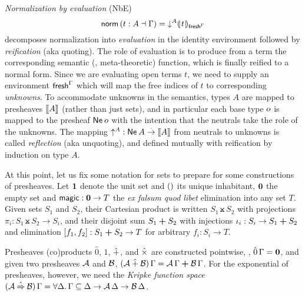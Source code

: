 \documentclass[sigplan,screen]{acmart}
\begin{document}
%
\emph{Normalization by evaluation} (NbE)
\[
  \mathsf{norm}\, (t : A \dashv \Gamma)
  = \mathord{\downarrow_{}^{A}} \llparenthesis\kern0.3ext\kern0.3ex\rrparenthesis_{\mathsf{fresh}^{\Gamma}}
\]
decomposes normalization into
\emph{evaluation}
in the identity environment \nofbox{$\idenv\Gamma : \den \Gamma \Gamma$}
followed by
\emph{reification}
(aka quoting).
The role of evaluation is to produce from a term the corresponding
semantic (\ie, meta-theoretic) function, which is finally reified to a normal form.
Since we are evaluating open terms $t$, we need to supply an environment
$\mathsf{fresh}^{\Gamma}$ which will map the free indices of $t$ to corresponding
\emph{unknowns}.  To accommodate unknowns in the semantics, types $A$
are mapped to presheaves $\mathopen{{[\kern-0.14em[}} A \mathclose{{]\kern-0.14em]}}$ (rather than just sets), and in
particular each base type $o$ is mapped to the presheaf
$\mathsf{Ne}^{}\,o$ with the intention that the neutrals take the role of
the unknowns.  The mapping $\mathord{\uparrow_{}^{A}} : \mathsf{Ne}^{}\,A \stackrel{\cdot}{\to} \mathopen{{[\kern-0.14em[}} A \mathclose{{]\kern-0.14em]}}$ from
neutrals to unknowns is called \emph{reflection} (aka unquoting), and defined mutually
with reification by induction on type $A$.

At this point, let us fix some notation for sets to prepare for some
constructions of presheaves.  Let $\mbox{\textbf{1}}$ denote the unit set and
$()$ its unique inhabitant, $\mbox{\textbf{0}}$ the empty set and
$\mathsf{magic} : \mbox{\textbf{0}} \to T$ the \emph{ex falsum quod libet} elimination
into any set $T$.  Given sets $S_1$ and $S_2$, their Cartesian product
is written $S_1 \btimes S_2$ with projections $\pi_i : S_1 \btimes S_2
\to S_i$, and their disjoint sum $S_1 \boldsymbol{+} S_2$ with injections
$\iota_i : S_i \to S_1 \boldsymbol{+} S_2$ and elimination $[f_1,f_2] : S_1 \boldsymbol{+}
S_2 \to T$ for arbitrary $f_i : S_i \to T$.

Presheaves (co)products $\hat0$, $\hat1$, $\mathbin{\hat+}$, and $\mathbin{\hat\times}$ are
constructed pointwise, \eg, $\hat0\,\Gamma = \mbox{\textbf{0}}$, and given two
presheaves $\mathcal{A}$ and $\mathcal{B}$,
$(\mathcal{A} \mathbin{\hat+} \mathcal{B})\,\Gamma = \mathcal{A}\,\Gamma \boldsymbol{+} \mathcal{B}\,\Gamma$.  For the
exponential of presheaves, however, we need the \emph{Kripke function
  space}
$(\A \hatto \B)\,\Gamma = \forall \Delta.\, \Gamma \sublist \Delta
\to \A\,\Delta \to \B\,\Delta$.
\end{document}
